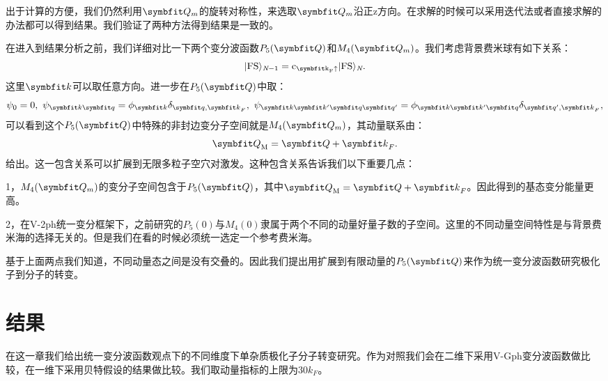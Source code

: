 出于计算的方便，我们仍然利用$\Vector{Q}_m$的旋转对称性，来选取$\Vector{Q}_m$沿正z方向。在求解的时候可以采用迭代法或者直接求解的办法都可以得到结果。我们验证了两种方法得到结果是一致的。

在进入到结果分析之前，我们详细对比一下两个变分波函数$P_5(\Vector{Q})$和$M_4(\Vector{Q}_m)$。我们考虑背景费米球有如下关系：
\begin{equation}
|\rm FS\rangle_{\textit{N}-1}=c_{{\Vector{k} }_F \uparrow}|\rm FS\rangle_\textit{N}. \label{relation}
\end{equation}
这里$\Vector{k}$可以取任意方向。进一步在$P_5(\Vector{Q})$中取：
\begin{equation}
\psi_0=0, \ \psi_{{\Vector{k} }  {\Vector{q} } }=\phi_{\Vector{k} }\delta_{{\Vector{q} },{\Vector{k} }_F},\ \psi_{{\Vector{k} }{\Vector{k'} }  {\Vector{q} }{\Vector{q'} }}=\phi_{{\Vector{k} }{\Vector{k'} }  {\Vector{q} } }\delta_{{\Vector{q'} },{\Vector{k} }_F}, \label{corr1}
\end{equation}
可以看到这个$P_5(\Vector{Q})$中特殊的非封边变分子空间就是$M_4(\Vector{Q}_m)$，其动量联系由：
\begin{equation}
{\Vector{Q} }_{\rm M}={\Vector{Q} }+{\Vector{k} }_F.  \label{corr2}
\end{equation}
给出。这一包含关系可以扩展到无限多粒子空穴对激发。这种包含关系告诉我们以下重要几点：

1，$M_4(\Vector{Q}_m)$的变分子空间包含于$P_5(\Vector{Q})$，其中${\Vector{Q} }_{\rm M}={\Vector{Q} }+{\Vector{k} }_F$。因此得到的基态变分能量更高。

2，在V-2ph统一变分框架下，之前研究的$P_5(0)$与$M_4(0)$隶属于两个不同的动量好量子数的子空间。这里的不同动量空间特性是与背景费米海的选择无关的。但是我们在看的时候必须统一选定一个参考费米海。

基于上面两点我们知道，不同动量态之间是没有交叠的。因此我们提出用扩展到有限动量的$P_5(\Vector{Q})$来作为统一变分波函数研究极化子到分子的转变。

\section{结果}
在这一章我们给出统一变分波函数观点下的不同维度下单杂质极化子分子转变研究。作为对照我们会在二维下采用V-Gph变分波函数做比较，在一维下采用贝特假设的结果做比较。我们取动量指标的上限为$30k_F$。

